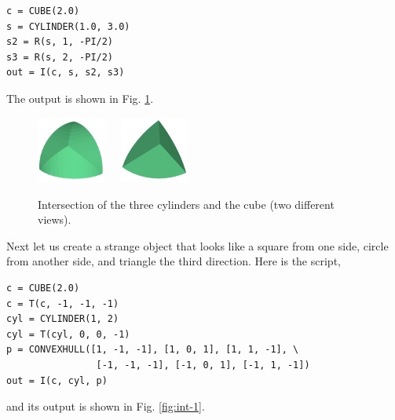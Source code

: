 \begin{bbox}
\begin{verbatim}
c = CUBE(2.0)
s = CYLINDER(1.0, 3.0)
s2 = R(s, 1, -PI/2)
s3 = R(s, 2, -PI/2)
out = I(c, s, s2, s3) 
\end{verbatim}
\end{bbox}
\vspace{6mm}

\noindent
The output is shown in Fig. \ref{fig:int-2}.

\begin{figure}[!ht]
\begin{center}
\includegraphics[width=0.2\textwidth]{img/int-2a.png}\ \ \ 
\includegraphics[width=0.2\textwidth]{img/int-2b.png}
\end{center}
\vspace{-4mm}
\caption{Intersection of the three cylinders and the cube (two different views).}
\label{fig:int-2}
\end{figure}
\noindent
Next let us create 
a strange object that looks like a square from one side,
circle from another side, and triangle the third direction. 
Here is the script,\\

\begin{bbox}
\begin{verbatim}
c = CUBE(2.0)
c = T(c, -1, -1, -1)
cyl = CYLINDER(1, 2)
cyl = T(cyl, 0, 0, -1)
p = CONVEXHULL([1, -1, -1], [1, 0, 1], [1, 1, -1], \
                [-1, -1, -1], [-1, 0, 1], [-1, 1, -1])
out = I(c, cyl, p)
\end{verbatim}
\end{bbox}
\vspace{6mm}

\noindent
and its output is shown in Fig. \ref{fig:int-1}.\\

